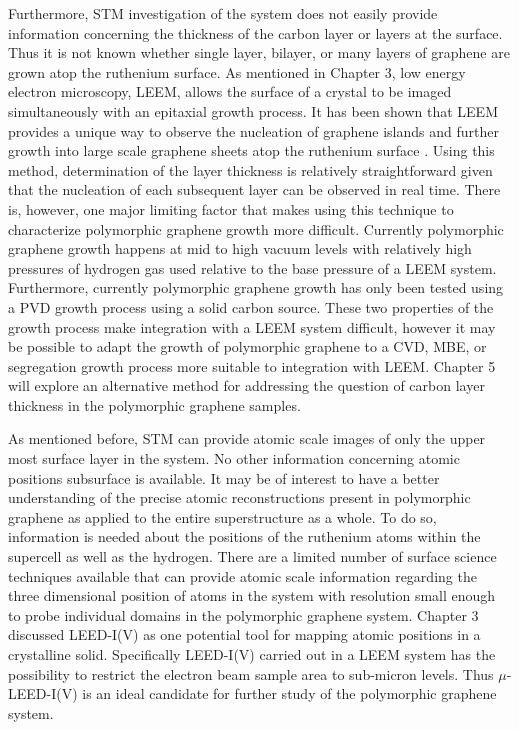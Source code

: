 Furthermore, STM investigation of the system does not easily provide information concerning the thickness of the carbon layer or layers at the surface. Thus it is not known whether single layer, bilayer, or many layers of graphene are grown atop the ruthenium surface. As mentioned in Chapter 3, low energy electron microscopy, LEEM, allows the surface of a crystal to be imaged simultaneously with an epitaxial growth process. It has been shown that LEEM provides a unique way to observe the nucleation of graphene islands and further growth into large scale graphene sheets atop the ruthenium surface \cite{mccarty-carbon, c-clusters}. Using this method, determination of the layer thickness is relatively straightforward given that the nucleation of each subsequent layer can be observed in real time. There is, however, one major limiting factor that makes using this technique to characterize polymorphic graphene growth more difficult. Currently polymorphic graphene growth happens at mid to high vacuum levels with relatively high pressures of hydrogen gas used relative to the base pressure of a LEEM system. Furthermore, currently polymorphic graphene growth has only been tested using a PVD growth process using a solid carbon source. These two properties of the growth process make integration with a LEEM system difficult, however it may be possible to adapt the growth of polymorphic graphene to a CVD, MBE, or segregation growth process more suitable to integration with LEEM. Chapter 5 will explore an alternative method for addressing the question of carbon layer thickness in the polymorphic graphene samples.

As mentioned before, STM can provide atomic scale images of only the upper most surface layer in the system. No other information concerning atomic positions subsurface is available. It may be of interest to have a better understanding of the precise atomic reconstructions present in polymorphic graphene as applied to the entire superstructure as a whole. To do so, information is needed about the positions of the ruthenium atoms within the supercell as well as the hydrogen. There are a limited number of surface science techniques available that can provide atomic scale information regarding the three dimensional position of atoms in the system with resolution small enough to probe individual domains in the polymorphic graphene system. Chapter 3 discussed LEED-I(V) as one potential tool for mapping atomic positions in a crystalline solid. Specifically LEED-I(V) carried out in a LEEM system has the possibility to restrict the electron beam sample area to sub-micron levels. Thus $\mu$-LEED-I(V) is an ideal candidate for further study of the polymorphic graphene system.

